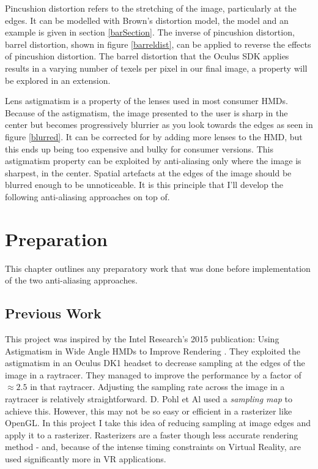 \documentclass[12pt,a4paper,twoside,openright]{report}
\begin{document}
Pincushion distortion refers to the stretching of the image, particularly at the edges. It can be modelled with Brown's distortion model, the model and an example is given in section \ref{barSection}.  The inverse of pincushion distortion, barrel distortion, shown in figure \ref{barreldist}, can be applied to reverse the effects of pincushion distortion. The barrel distortion that the Oculus SDK\cite{oculus} applies results in a varying number of texels per pixel in our final image, a property will be explored in an extension. \par Lens astigmatism is a property of the lenses used in most consumer HMDs. Because of the astigmatism, the image presented to the user is sharp in the center but becomes progressively blurrier as you look towards the edges as seen in figure \ref{blurred}. It can be corrected for by adding more lenses to the HMD, but this ends up being too expensive and bulky for consumer versions. This astigmatism property can be exploited by anti-aliasing only where the image is sharpest, in the center. Spatial artefacts at the edges of the image should be blurred enough to be unnoticeable. It is this principle that I'll develop the following anti-aliasing approaches on top of.

\chapter{Preparation}

This chapter outlines any preparatory work that was done before implementation of the two anti-aliasing approaches.

\section{Previous Work}

This project was inspired by the Intel Research's 2015 publication: Using Astigmatism in Wide Angle HMDs to Improve Rendering \cite{Astigpap}. They exploited the astigmatism in an Oculus DK1 headset to decrease sampling at the edges of the image in a raytracer. They managed to improve the performance by a factor of $\approx 2.5$ in that raytracer.
Adjusting the sampling rate across the image in a raytracer is relatively straightforward. D. Pohl et Al used a \emph{sampling map} to achieve this. However, this may not be so easy or efficient in a rasterizer like OpenGL. In this project I take this idea of reducing sampling at image edges and apply it to a rasterizer. Rasterizers are a faster though less accurate rendering method - and, because of the intense timing constraints on Virtual Reality, are used significantly more in VR applications. 
\end{document}
